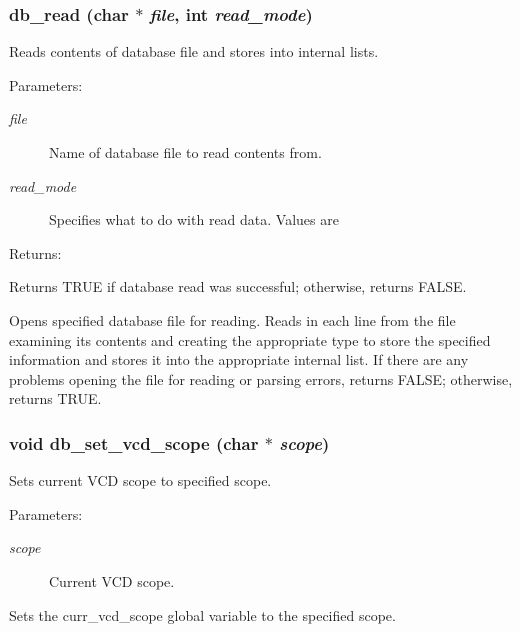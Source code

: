 \subsubsection{ db\_\-read (char $\ast$ {\em file}, int {\em read\_\-mode})}\label{db_8c_a14}


Reads contents of database file and stores into internal lists.

\begin{Desc}
\item[Parameters: ]\par
\begin{description}
\item[{\em 
file}]Name of database file to read contents from. \item[{\em 
read\_\-mode}]Specifies what to do with read data. Values are
\end{description}
\end{Desc}
\begin{Desc}
\item[Returns: ]\par
Returns TRUE if database read was successful; otherwise, returns FALSE.\end{Desc}
Opens specified database file for reading. Reads in each line from the file examining its contents and creating the appropriate type to store the specified information and stores it into the appropriate internal list. If there are any problems opening the file for reading or parsing errors, returns FALSE; otherwise, returns TRUE. 
\subsubsection{\setlength{\rightskip}{0pt plus 5cm}void db\_\-set\_\-vcd\_\-scope (char $\ast$ {\em scope})}\label{db_8c_a27}


Sets current VCD scope to specified scope.

\begin{Desc}
\item[Parameters: ]\par
\begin{description}
\item[{\em 
scope}]Current VCD scope.\end{description}
\end{Desc}
Sets the curr\_\-vcd\_\-scope global variable to the specified scope. 
